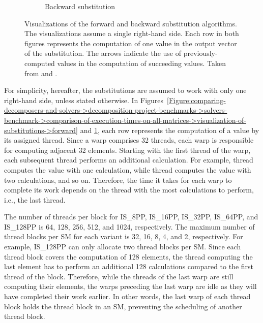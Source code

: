 \begin{figure}[ht!]
\begin{subfigure}[b]{0.48\textwidth}
		\caption{Backward substitution}
		\label{Figure:comparing-decomposers-and-solvers->decomposition-project-benchmarks->solvers-benchmark->comparison-of-execution-times-on-all-matrices->visualization-of-substitutions->backward}
	\end{subfigure}
	\caption{Visualizations of the forward and backward substitution algorithms. The visualizations assume a single right-hand side. Each row in both figures represents the computation of one value in the output vector of the substitution. The arrows indicate the use of previously-computed values in the computation of succeeding values. Taken from  \cite{Frolov18July2022} and  \cite{Frolov17July2022}.}
	\label{Figure:comparing-decomposers-and-solvers->decomposition-project-benchmarks->solvers-benchmark->comparison-of-execution-times-on-all-matrices->visualization-of-substitutions}
\end{figure}

For simplicity, hereafter, the substitutions are assumed to work with only one right-hand side, unless stated otherwise. In Figures~\ref{Figure:comparing-decomposers-and-solvers->decomposition-project-benchmarks->solvers-benchmark->comparison-of-execution-times-on-all-matrices->visualization-of-substitutions->forward} and \ref{Figure:comparing-decomposers-and-solvers->decomposition-project-benchmarks->solvers-benchmark->comparison-of-execution-times-on-all-matrices->visualization-of-substitutions->backward}, each row represents the computation of a value by its assigned thread. Since a warp comprises 32 threads, each warp is responsible for computing adjacent 32 elements. Starting with the first thread of the warp, each subsequent thread performs an additional calculation. For example, thread  computes the value with one calculation, while thread  computes the value with two calculations, and so on. Therefore, the time it takes for each warp to complete its work depends on the thread with the most calculations to perform, i.e., the last thread.

The number of threads per block for IS\_8PP, IS\_16PP, IS\_32PP, IS\_64PP, and IS\_128PP is 64, 128, 256, 512, and 1024, respectively. The maximum number of thread blocks per SM for each variant is 32, 16, 8, 4, and 2, respectively. For example, IS\_128PP can only allocate two thread blocks per SM. Since each thread block covers the computation of 128 elements, the thread computing the last element has to perform an additional 128 calculations compared to the first thread of the block. Therefore, while the threads of the last warp are still computing their elements, the warps preceding the last warp are idle as they will have completed their work earlier. In other words, the last warp of each thread block holds the thread block in an SM, preventing the scheduling of another thread block.

